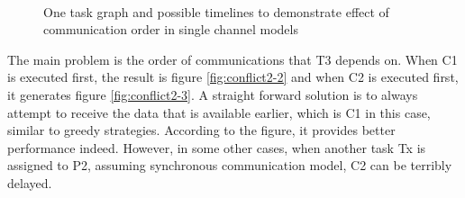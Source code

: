 \documentclass[msc,deptreport, cs]{infthesis}
\begin{document}
\begin{figure}[htpb]
  \centering
  \vspace{1em}
  \hspace{3em}
   \hspace{4em}
   \\
   \hspace{1em}
  \caption{One task graph and possible timelines to demonstrate effect of communication order in single channel models}
  \label{fig:conflict2}
\end{figure}

The main problem is the order of communications that T3 depends on. When C1 is executed first, the result is figure \ref{fig:conflict2-2} and when C2 is executed first, it generates figure \ref{fig:conflict2-3}. A straight forward solution is to always attempt to receive the data that is available earlier, which is C1 in this case, similar to greedy strategies. According to the figure, it provides better performance indeed. However, in some other cases, when another task Tx is assigned to P2, assuming synchronous communication model, C2 can be terribly delayed.
\end{document}
